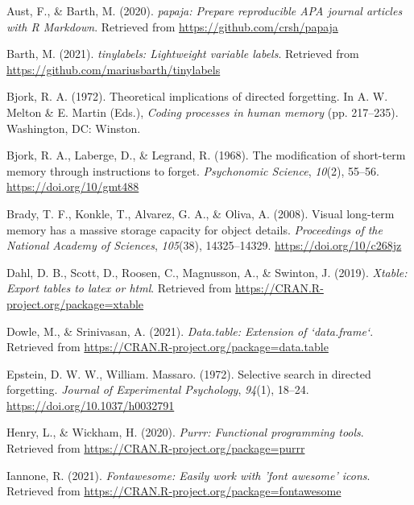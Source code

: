 \documentclass[
  english,
  man,floatsintext]{apa6}
\begin{document}
\leavevmode\hypertarget{ref-R-papaja}{}%
Aust, F., \& Barth, M. (2020). \emph{papaja: Prepare reproducible APA journal articles with R Markdown}. Retrieved from \url{https://github.com/crsh/papaja}

\leavevmode\hypertarget{ref-R-tinylabels}{}%
Barth, M. (2021). \emph{tinylabels: Lightweight variable labels}. Retrieved from \url{https://github.com/mariusbarth/tinylabels}

\leavevmode\hypertarget{ref-bjorkTheoreticalImplicationsDirected1972}{}%
Bjork, R. A. (1972). Theoretical implications of directed forgetting. In A. W. Melton \& E. Martin (Eds.), \emph{Coding processes in human memory} (pp. 217--235). Washington, DC: Winston.

\leavevmode\hypertarget{ref-bjorkModificationShorttermMemory1968}{}%
Bjork, R. A., Laberge, D., \& Legrand, R. (1968). The modification of short-term memory through instructions to forget. \emph{Psychonomic Science}, \emph{10}(2), 55--56. \url{https://doi.org/10/gmt488}

\leavevmode\hypertarget{ref-bradyVisualLongtermMemory2008}{}%
Brady, T. F., Konkle, T., Alvarez, G. A., \& Oliva, A. (2008). Visual long-term memory has a massive storage capacity for object details. \emph{Proceedings of the National Academy of Sciences}, \emph{105}(38), 14325--14329. \url{https://doi.org/10/c268jz}

\leavevmode\hypertarget{ref-R-xtable}{}%
Dahl, D. B., Scott, D., Roosen, C., Magnusson, A., \& Swinton, J. (2019). \emph{Xtable: Export tables to latex or html}. Retrieved from \url{https://CRAN.R-project.org/package=xtable}

\leavevmode\hypertarget{ref-R-data.table}{}%
Dowle, M., \& Srinivasan, A. (2021). \emph{Data.table: Extension of `data.frame`}. Retrieved from \url{https://CRAN.R-project.org/package=data.table}

\leavevmode\hypertarget{ref-EpsteinW1972}{}%
Epstein, D. W. W., William. Massaro. (1972). Selective search in directed forgetting. \emph{Journal of Experimental Psychology}, \emph{94}(1), 18--24. \url{https://doi.org/10.1037/h0032791}

\leavevmode\hypertarget{ref-R-purrr}{}%
Henry, L., \& Wickham, H. (2020). \emph{Purrr: Functional programming tools}. Retrieved from \url{https://CRAN.R-project.org/package=purrr}

\leavevmode\hypertarget{ref-R-fontawesome}{}%
Iannone, R. (2021). \emph{Fontawesome: Easily work with 'font awesome' icons}. Retrieved from \url{https://CRAN.R-project.org/package=fontawesome}
\end{document}
